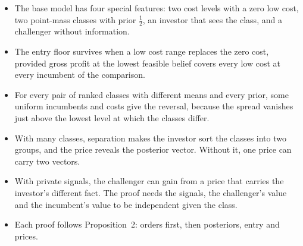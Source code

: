 \begin{chaptersummary}
\begin{itemize}
\item The base model has four special features: two cost levels with a zero low cost, two point-mass classes with prior \(\tfrac12\), an investor that sees the class, and a challenger without information.
\item The entry floor survives when a low cost range replaces the zero cost, provided gross profit at the lowest feasible belief covers every low cost at every incumbent of the comparison.
\item For every pair of ranked classes with different means and every prior, some uniform incumbents and costs give the reversal, because the spread vanishes just above the lowest level at which the classes differ.
\item With many classes, separation makes the investor sort the classes into two groups, and the price reveals the posterior vector. Without it, one price can carry two vectors.
\item With private signals, the challenger can gain from a price that carries the investor's different fact. The proof needs the signals, the challenger's value and the incumbent's value to be independent given the class.
\item Each proof follows Proposition~2: orders first, then posteriors, entry and prices.
\end{itemize}
\end{chaptersummary}

\answersection


